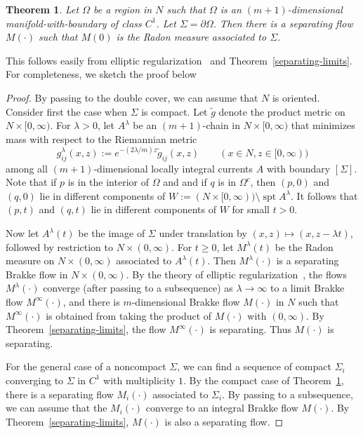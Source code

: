\documentclass{amsart}
\newcommand{\spt}{\operatorname{spt}}
\newtheorem{theorem}    {Theorem}   %
\theoremstyle{definition}
\theoremstyle{definition}
\begin{document}
\begin{theorem}\label{separating-flow-existence-theorem}
Let $\Omega$ be a region in $N$ such that $\Omega$ is an $(m+1)$-dimensional
manifold-with-boundary of class $C^1$.   Let $\Sigma=\partial \Omega$.
Then there is a separating flow $M(\cdot)$ such that $M(0)$ is the Radon measure associated
to $\Sigma$.
\end{theorem}

This follows easily from elliptic regularization~\cite{ilmanen-elliptic}
 and Theorem~\ref{separating-limits}.
For completeness, we sketch the proof below


\begin{proof}
By passing to the double cover, we can assume that $N$ is oriented.
Consider first the case when $\Sigma$ is compact.
Let $\tilde g$ denote the product metric on $N\times [0,\infty)$.
For $\lambda>0$, let $A^\lambda$ be an $(m+1)$-chain in $N\times [0,\infty)$ that
minimizes mass with respect to the Riemannian metric
\[
   g^{\lambda}_{ij}(x,z) := e^{-(2\lambda/m)z} \tilde g_{ij}(x,z)   \qquad(x\in N, z\in [0,\infty))
\]
among all $(m+1)$-dimensional locally integral currents $A$ with boundary $[\Sigma]$.
Note that if $p$ is in the interior of $\Omega$ and and if $q$ is in $\Omega^c$,
then $(p,0)$ and $(q,0)$
lie in different components of $W:=(N\times[0,\infty))\setminus \spt A^\lambda$.
It follows that $(p,t)$ and $(q,t)$ lie in different components of $W$ for small $t>0$.


Now let $A^\lambda(t)$ be the image of $\Sigma$ under  translation by
  $(x,z) \mapsto (x, z - \lambda t)$, followed by restriction to $N\times (0,\infty)$.
For $t\ge 0$, let $M^\lambda(t)$ be the Radon measure on $N\times (0,\infty)$
associated to $A^\lambda(t)$.
Then $M^\lambda(\cdot)$ is a separating Brakke flow in $N\times (0,\infty)$.
By the theory of elliptic regularization~\cite{ilmanen-elliptic},
 the flows $M^\lambda(\cdot)$ converge 
 (after passing to a subsequence) as $\lambda\to\infty$
  to a limit Brakke flow $M^\infty(\cdot)$,
and  there is $m$-dimensional Brakke flow $M(\cdot)$
in $N$
such that $M^\infty(\cdot)$ is obtained from taking the product of $M(\cdot)$ with $(0,\infty)$.
By  Theorem~\ref{separating-limits}, the flow $M^\infty(\cdot)$ is separating.  Thus $M(\cdot)$ is separating.


For the general case of a noncompact $\Sigma$, we can find a sequence of compact $\Sigma_i$
converging to $\Sigma$ in $C^1$ with multiplicity $1$.
By the compact case of Theorem~\ref{separating-flow-existence-theorem},
  there is a separating flow $M_i(\cdot)$ associated to $\Sigma_i$.
By passing to a subsequence, we can assume that the $M_i(\cdot)$ converge
to an integral Brakke flow $M(\cdot)$.
By Theorem~\ref{separating-limits}, $M(\cdot)$ is also a separating flow.
\end{proof}
\end{document}
